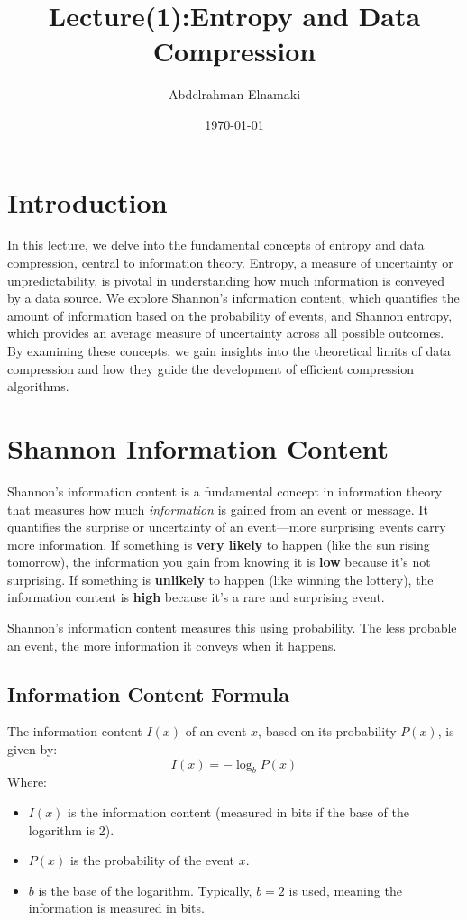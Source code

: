 \documentclass[12pt]{article}
\title{ Lecture(1):Entropy and Data Compression}
\author{Abdelrahman Elnamaki}
\date{\today}
\begin{document}
\maketitle

\section*{Introduction}
In this lecture, we delve into the fundamental concepts of entropy and data compression, central to information theory. Entropy, a measure of uncertainty or unpredictability, is pivotal in understanding how much information is conveyed by a data source. We explore Shannon’s information content, which quantifies the amount of information based on the probability of events, and Shannon entropy, which provides an average measure of uncertainty across all possible outcomes. By examining these concepts, we gain insights into the theoretical limits of data compression and how they guide the development of efficient compression algorithms.

\section{Shannon Information Content}

Shannon's information content is a fundamental concept in information theory that measures how much \textit{information} is gained from an event or message. It quantifies the surprise or uncertainty of an event—more surprising events carry more information. If something is \textbf{very likely} to happen (like the sun rising tomorrow), the information you gain from knowing it is \textbf{low} because it's not surprising. If something is \textbf{unlikely} to happen (like winning the lottery), the information content is \textbf{high} because it's a rare and surprising event.

Shannon's information content measures this using probability. The less probable an event, the more information it conveys when it happens.

\subsection{Information Content Formula }

The information content \( I(x) \) of an event \( x \), based on its probability \( P(x) \), is given by:
\[
I(x) = - \log_b P(x)
\]
Where:
\begin{itemize}
    \item \( I(x) \) is the information content (measured in bits if the base of the logarithm is 2).
    \item \( P(x) \) is the probability of the event \( x \).
    \item \( b \) is the base of the logarithm. Typically, \( b = 2 \) is used, meaning the information is measured in bits.
\end{itemize}
\end{document}
